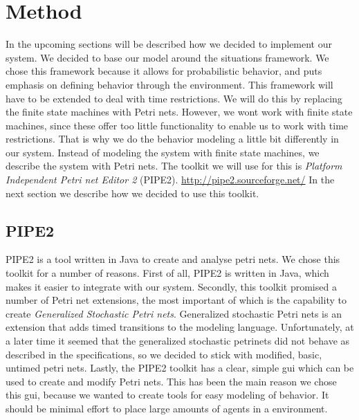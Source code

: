\documentclass[11pt]{book}
\begin{document}
\section{Method}
In the upcoming sections will be described how we decided to implement our system. We decided to base our model around the situations framework. We chose this framework because it allows for probabilistic behavior, and puts emphasis on defining behavior through the environment. This framework will have to be extended to deal with time restrictions. We will do this by replacing the finite state machines with Petri nets. However, we wont work with finite state machines, since these offer too little functionality to enable us to work with time restrictions. That is why we do the behavior modeling a little bit differently in our system. Instead of modeling the system with finite state machines, we describe the system with Petri nets.  The toolkit we will use for this is \emph{Platform Independent Petri net Editor 2} (PIPE2). \url{http://pipe2.sourceforge.net/} In the next section we describe how we decided to use this toolkit.

\subsection{PIPE2}
PIPE2 is a tool written in Java to create and analyse petri nets. We chose this toolkit for a number of reasons. First of all, PIPE2 is written in Java, which makes it easier to integrate with our system. Secondly, this toolkit promised a number of Petri net extensions, the most important of which is the capability to create \emph{Generalized Stochastic Petri nets}. Generalized stochastic Petri nets is an extension that adds timed transitions to the modeling language.
Unfortunately, at a later time it seemed that the generalized stochastic petrinets did not behave as described in the specifications, so we decided to stick with modified, basic, untimed petri nets. Lastly, the PIPE2 toolkit has a clear, simple gui which can be used to create and modify Petri nets. This has been the main reason we chose this gui, because we wanted to create tools for easy modeling of behavior. It should be minimal effort to place large amounts of agents in a environment.
\end{document}
